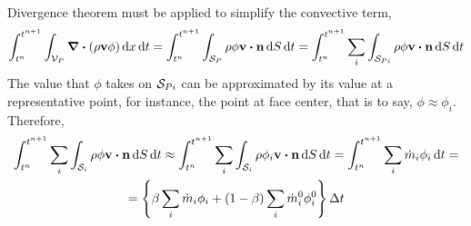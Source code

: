 Divergence theorem must be applied to simplify the convective term,
\begin{equation*} 
	\int_{t^n}^{t^{n+1}} \int_{\cv{P}} \div(\rho \vb{v} \phi) \dd{x} \dd{t} = 
	\int_{t^n}^{t^{n+1}} \int_{\cs{P}} \rho \phi \vb{v} \vdot \vb{n} \dd{S} \dd{t} = 
	\int_{t^n}^{t^{n+1}} \sum_i \int_{\cs{Pi}} \rho \phi \vb{v} \vdot \vb{n} \dd{S} \dd{t}
\end{equation*}
The value that $\phi$ takes on $\mathcal{S}_{Pi}$ can be approximated by its value at a
representative point, for instance, the point at face center, that is to say,
$\phi \approx \phi_i$. Therefore,
\begin{multline*}
	\int_{t^n}^{t^{n+1}} \sum_i \int_{\mathcal{S}_i} \rho \phi \vb{v} \vdot \vb{n} \dd{S} \dd{t} \approx 
	\int_{t^n}^{t^{n+1}} \sum_i \int_{\mathcal{S}_i} \rho \phi_i \vb{v} \vdot \vb{n} \dd{S} \dd{t} =
	\int_{t^n}^{t^{n+1}} \sum_i \dot{m}_i \phi_i \dd{t} = \\
	= \left\{ \beta \sum_i \dot{m}_i \phi_i + (1 - \beta) \sum_i \dot{m}_i^0 \phi_i^0 \right\} \Delta t	
\end{multline*}

